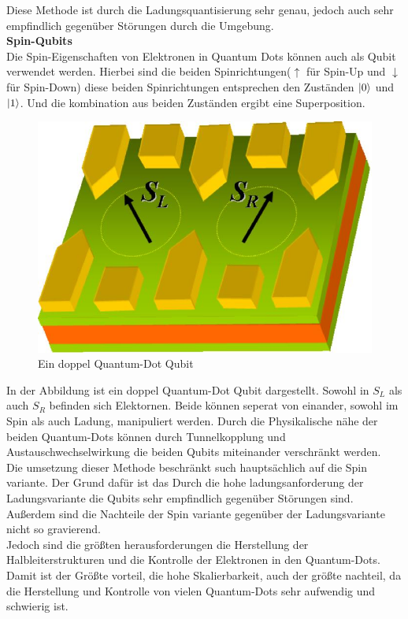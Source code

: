 Diese Methode ist durch die Ladungsquantisierung sehr genau, jedoch auch sehr empfindlich gegenüber Störungen durch die Umgebung.\\

\textbf{Spin-Qubits}\\
Die Spin-Eigenschaften von Elektronen in Quantum Dots können auch als Qubit verwendet werden. Hierbei sind die beiden Spinrichtungen($\uparrow$ für Spin-Up und $\downarrow$ für Spin-Down)
diese beiden Spinrichtungen entsprechen den Zuständen $\ket{0}$ und $\ket{1}$. Und die kombination aus beiden Zuständen ergibt eine Superposition.\\

\begin{figure}[!ht]
    \centering
    \includegraphics[width=0.75\linewidth]{img/QD.png}
    \caption{Ein doppel Quantum-Dot Qubit}
    \label{fig:double-Quantum-Dot}
\end{figure}

In der Abbildung ist ein doppel Quantum-Dot Qubit dargestellt. Sowohl in $S_L$ als auch $S_R$ befinden sich Elektornen. Beide können seperat von einander, sowohl im Spin als auch Ladung, manipuliert werden.
Durch die Physikalische nähe der beiden Quantum-Dots können durch Tunnelkopplung und Austauschwechselwirkung die beiden Qubits miteinander verschränkt werden.\\

Die umsetzung dieser Methode beschränkt such hauptsächlich auf die Spin variante. Der Grund dafür ist das Durch die hohe ladungsanforderung der Ladungsvariante die Qubits sehr empfindlich gegenüber Störungen sind.
Außerdem sind die Nachteile der Spin variante gegenüber der Ladungsvariante nicht so gravierend.\\
Jedoch sind die größten herausforderungen die Herstellung der Halbleiterstrukturen und die Kontrolle der Elektronen in den Quantum-Dots.
Damit ist der Größte vorteil, die hohe Skalierbarkeit, auch der größte nachteil, da die Herstellung und Kontrolle von vielen Quantum-Dots sehr aufwendig und schwierig ist.\\

